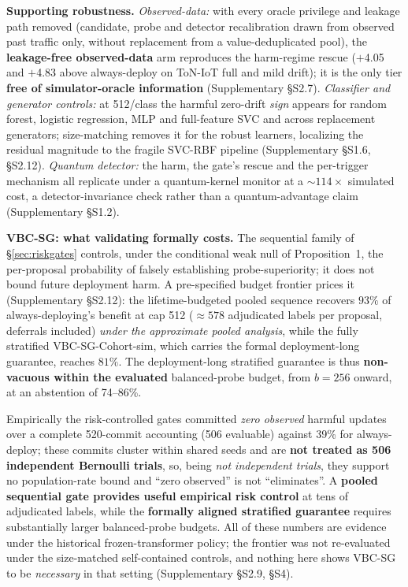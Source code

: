 \documentclass[journal]{IEEEtran}
\begin{document}
\textbf{Supporting robustness.} \emph{Observed-data:} with every oracle privilege and leakage path removed (candidate, probe and detector recalibration drawn from observed past traffic only, without replacement from a value-deduplicated pool), the \textbf{leakage-free observed-data} arm reproduces the harm-regime rescue ($+$4.05 and $+$4.83 above always-deploy on ToN-IoT full and mild drift); it is the only tier \textbf{free of simulator-oracle information} (Supplementary \S S2.7). \emph{Classifier and generator controls:} at 512/class the harmful zero-drift \emph{sign} appears for random forest, logistic regression, MLP and full-feature SVC and across replacement generators; size-matching removes it for the robust learners, localizing the residual magnitude to the fragile SVC-RBF pipeline (Supplementary \S S1.6, \S S2.12). \emph{Quantum detector:} the harm, the gate's rescue and the per-trigger mechanism all replicate under a quantum-kernel monitor at a ${\sim}114\times$ simulated cost, a detector-invariance check rather than a quantum-advantage claim (Supplementary \S S1.2).

\textbf{VBC-SG: what validating formally costs.} The sequential family of \S\ref{sec:riskgates} controls, under the conditional weak null of Proposition~1, the per-proposal probability of falsely establishing probe-superiority; it does not bound future deployment harm. A pre-specified budget frontier prices it (Supplementary \S S2.12): the lifetime-budgeted pooled sequence recovers $93\%$ of always-deploying's benefit at cap 512 (${\approx}578$ adjudicated labels per proposal, deferrals included) \emph{under the approximate pooled analysis}, while the fully stratified VBC-SG-Cohort-sim, which carries the formal deployment-long guarantee, reaches $81\%$. The deployment-long stratified guarantee is thus \textbf{non-vacuous within the evaluated} balanced-probe budget, from $b{=}256$ onward, at an abstention of 74--86\%.

Empirically the risk-controlled gates committed \emph{zero observed} harmful updates over a complete 520-commit accounting (506 evaluable) against 39\% for always-deploy; these commits cluster within shared seeds and are \textbf{not treated as 506 independent Bernoulli trials}, so, being \emph{not independent trials}, they support no population-rate bound and ``zero observed'' is not ``eliminates''. A \textbf{pooled sequential gate provides useful empirical risk control} at tens of adjudicated labels, while the \textbf{formally aligned stratified guarantee} requires substantially larger balanced-probe budgets. All of these numbers are evidence under the historical frozen-transformer policy; the frontier was not re-evaluated under the size-matched self-contained controls, and nothing here shows VBC-SG to be \emph{necessary} in that setting (Supplementary \S S2.9, \S S4).
\end{document}
